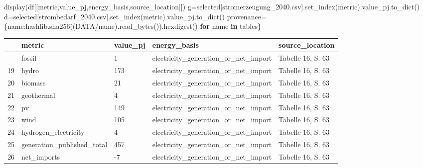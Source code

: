 \documentclass[
  ngerman,
  a4paper,
  DIV=11]{scrreprt}
\newenvironment{Shaded}{\begin{snugshade}}{\end{snugshade}}
\newcommand{\ControlFlowTok}[1]{\textcolor[rgb]{0.00,0.23,0.31}{\textbf{#1}}}
\newcommand{\KeywordTok}[1]{\textcolor[rgb]{0.00,0.23,0.31}{\textbf{#1}}}
\newcommand{\NormalTok}[1]{\textcolor[rgb]{0.00,0.23,0.31}{#1}}
\newcommand{\OperatorTok}[1]{\textcolor[rgb]{0.37,0.37,0.37}{#1}}
\newcommand{\StringTok}[1]{\textcolor[rgb]{0.13,0.47,0.30}{#1}}
\newcounter{none} %
\begin{document}
\begin{Shaded}
\begin{Highlighting}[]
\NormalTok{    display(df[[}\StringTok{\textquotesingle{}metric\textquotesingle{}}\NormalTok{,}\StringTok{\textquotesingle{}value\_pj\textquotesingle{}}\NormalTok{,}\StringTok{\textquotesingle{}energy\_basis\textquotesingle{}}\NormalTok{,}\StringTok{\textquotesingle{}source\_location\textquotesingle{}}\NormalTok{]])}
\NormalTok{g}\OperatorTok{=}\NormalTok{selected[}\StringTok{\textquotesingle{}stromerzeugung\_2040.csv\textquotesingle{}}\NormalTok{].set\_index(}\StringTok{\textquotesingle{}metric\textquotesingle{}}\NormalTok{).value\_pj.to\_dict()}
\NormalTok{d}\OperatorTok{=}\NormalTok{selected[}\StringTok{\textquotesingle{}strombedarf\_2040.csv\textquotesingle{}}\NormalTok{].set\_index(}\StringTok{\textquotesingle{}metric\textquotesingle{}}\NormalTok{).value\_pj.to\_dict()}
\NormalTok{provenance}\OperatorTok{=}\NormalTok{\{name:hashlib.sha256((DATA}\OperatorTok{/}\NormalTok{name).read\_bytes()).hexdigest() }\ControlFlowTok{for}\NormalTok{ name }\KeywordTok{in}\NormalTok{ tables\}}
\end{Highlighting}
\end{Shaded}

{\def\LTcaptype{none} %
\begin{longtable}[]{@{}lllll@{}}
\toprule\noalign{}
& metric & value\_pj & energy\_basis & source\_location \\
\midrule\noalign{}
\endhead
\bottomrule\noalign{}
\endlastfoot
18 & fossil & 1 & electricity\_generation\_or\_net\_import & Tabelle 16,
S. 63 \\
19 & hydro & 173 & electricity\_generation\_or\_net\_import & Tabelle
16, S. 63 \\
20 & biomass & 21 & electricity\_generation\_or\_net\_import & Tabelle
16, S. 63 \\
21 & geothermal & 4 & electricity\_generation\_or\_net\_import & Tabelle
16, S. 63 \\
22 & pv & 149 & electricity\_generation\_or\_net\_import & Tabelle 16,
S. 63 \\
23 & wind & 105 & electricity\_generation\_or\_net\_import & Tabelle 16,
S. 63 \\
24 & hydrogen\_electricity & 4 &
electricity\_generation\_or\_net\_import & Tabelle 16, S. 63 \\
25 & generation\_published\_total & 457 &
electricity\_generation\_or\_net\_import & Tabelle 16, S. 63 \\
26 & net\_imports & -7 & electricity\_generation\_or\_net\_import &
Tabelle 16, S. 63 \\
\end{longtable}
}
\end{document}
